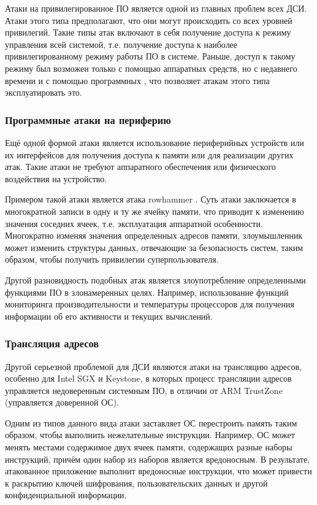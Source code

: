 Атаки на привилегированное ПО является одной из главных проблем всех ДСИ. Атаки этого типа предполагают, что они могут происходить со всех уровней привилегий. Такие типы атак включают в себя получение доступа к режиму управления всей системой, т.е. получение доступа к наиболее привилегированному режиму работы ПО в системе. Раньше, доступ к такому режиму был возможен только с помощью аппаратных средств, но с недавнего времени и с помощью программных \cite{comparsion-arm-intel}, что позволяет атакам этого типа эксплуатировать это.

\subsubsection{Программные атаки на периферию}

Ещё одной формой атаки является использование периферийных устройств или их интерфейсов для получения доступа к памяти или для реализации других атак. Такие атаки не требуют аппаратного обеспечения или физического воздействия на устройство. 

Примером такой атаки является атака rowhammer \cite{rowhammer}. Суть атаки заключается в многократной записи в одну и ту же ячейку памяти, что приводит к изменению значения соседних ячеек, т.е. эксплуатация аппаратной особенности. Многократно изменяя значения определенных адресов памяти, злоумышленник может изменить структуры данных, отвечающие за безопасность систем, таким образом, чтобы получить привилегии суперпользователя.

Другой разновидность подобных атак является злоупотребление определенными функциями ПО в злонамеренных целях. Например, использование функций мониторинга производительности и температуры процессоров для получения информации об его активности и текущих вычислений.

\subsubsection{Трансляция адресов}

Другой серьезной проблемой для ДСИ являются атаки на трансляцию адресов, особенно для Intel SGX и Keystone, в которых процесс трансляции адресов управляется недоверенным системным ПО, в отличии от ARM TrustZone (управляется доверенной ОС).

Одним из типов данного вида атаки заставляет ОС перестроить память таким образом, чтобы выполнить нежелательные инструкции. Например, ОС может менять местами содержимое двух ячеек памяти, содержащих разные наборы инструкций, причём один набор из наборов является вредоносным. В результате, атакованное приложение выполнит вредоносные инструкции, что может привести к раскрытию ключей шифрования, пользовательских данных и другой конфиденциальной информации.

